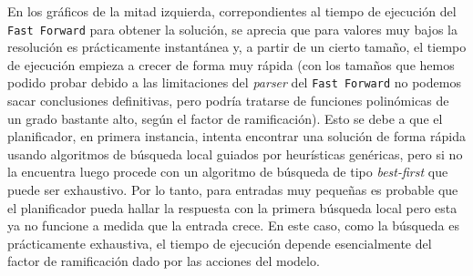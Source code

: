 
En los gráficos de la mitad izquierda, correpondientes al tiempo de ejecución 
del \texttt{Fast Forward} para obtener la solución, se aprecia que para 
valores muy bajos la resolución es prácticamente instantánea y, a partir de 
un cierto tamaño, el tiempo de ejecución empieza a crecer de forma muy rápida 
(con los tamaños que hemos podido probar debido a las limitaciones del 
\textit{parser} del \texttt{Fast Forward} no podemos sacar conclusiones 
definitivas, pero podría tratarse de funciones polinómicas de un grado 
bastante alto, según el factor de ramificación). Esto se debe a que el 
planificador, en primera instancia, intenta encontrar una solución de forma 
rápida usando algoritmos de búsqueda local guiados por heurísticas genéricas, 
pero si no la encuentra luego procede con un algoritmo de búsqueda de tipo
\textit{best-first} que puede ser exhaustivo. Por lo tanto, para entradas 
muy pequeñas es probable que el planificador pueda hallar la respuesta con 
la primera búsqueda local pero esta ya no funcione a medida que la entrada 
crece. En este caso, como la búsqueda es prácticamente exhaustiva, el tiempo 
de ejecución depende esencialmente del factor de ramificación dado por las 
acciones del modelo.

